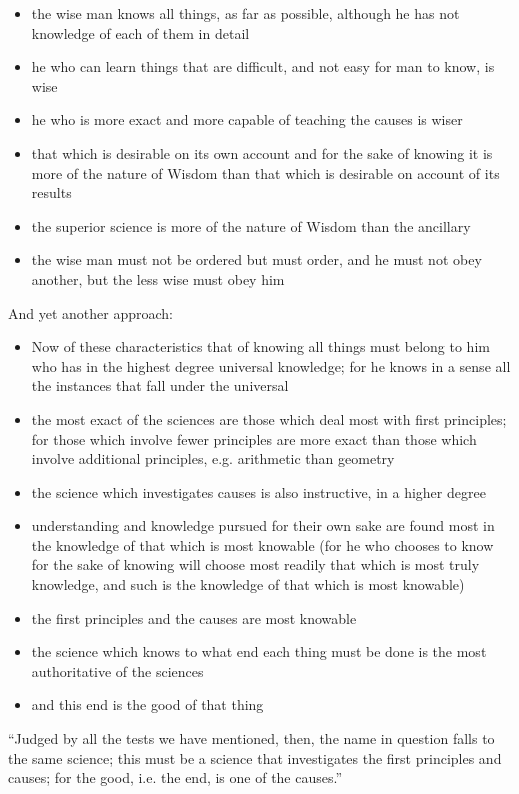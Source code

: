 \documentclass{rbjk}
\begin{document}
\begin{article}
\begin{itemize}
\item the wise man knows all things, as far as possible, although he has not knowledge of each of them in detail
\item he who can learn things that are difficult, and not easy for man to know, is wise
\item he who is more exact and more capable of teaching the causes is wiser
\item that which is desirable on its own account and for the sake of knowing it is more of the nature of Wisdom than that which is desirable on account of its results
\item the superior science is more of the nature of Wisdom than the ancillary
\item the wise man must not be ordered but must order, and he must not obey another, but the less wise must obey him
\end{itemize}

And yet another approach:

\begin{itemize}
\item Now of these characteristics that of knowing all things must belong to him who has in the highest degree universal knowledge; for he knows in a sense all the instances that fall under the universal
\item the most exact of the sciences are those which deal most with first principles; for those which involve fewer principles are more exact than those which involve additional principles, e.g. arithmetic than geometry
\item the science which investigates causes is also instructive, in a higher degree
\item understanding and knowledge pursued for their own sake are found most in the knowledge of that which is most knowable (for he who chooses to know for the sake of knowing will choose most readily that which is most truly knowledge, and such is the knowledge of that which is most knowable)
\item the first principles and the causes are most knowable
\item the science which knows to what end each thing must be done is the most authoritative of the sciences
\item and this end is the good of that thing
\end{itemize}

``Judged by all the tests we have mentioned, then, the name in question falls to the same science; this must be a science that investigates the first principles and causes; for the good, i.e. the end, is one of the causes.''


\end{article}
\end{document}
